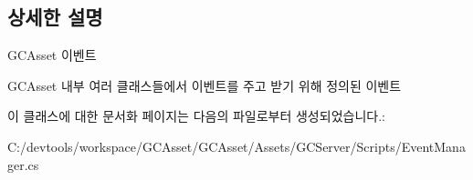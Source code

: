 \subsection{상세한 설명}
G\+C\+Asset 이벤트

G\+C\+Asset 내부 여러 클래스들에서 이벤트를 주고 받기 위해 정의된 이벤트 

이 클래스에 대한 문서화 페이지는 다음의 파일로부터 생성되었습니다.\+:\begin{DoxyCompactItemize}
\item 
C\+:/devtools/workspace/\+G\+C\+Asset/\+G\+C\+Asset/\+Assets/\+G\+C\+Server/\+Scripts/Event\+Manager.\+cs\end{DoxyCompactItemize}
